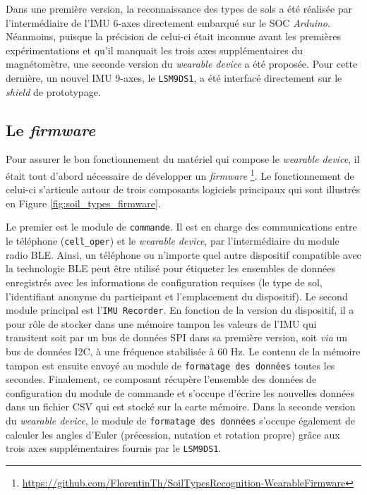 Dans une première version, la reconnaissance des types de sols a été réalisée par l'intermédiaire de l'IMU 6-axes directement embarqué sur le \acs{SOC} \textit{Arduino}. Néanmoins, puisque la précision de celui-ci était inconnue avant les premières expérimentations et qu'il manquait les trois axes supplémentaires du magnétomètre, une seconde version du \textit{wearable device} a été proposée. Pour cette dernière, un nouvel IMU 9-axes, le \texttt{LSM9DS1}, a été interfacé directement sur le \textit{shield} de prototypage.

\subsection{Le \textit{firmware}}

Pour assurer le bon fonctionnement du matériel qui compose le \textit{wearable device}, il était tout d'abord nécessaire de développer un \textit{firmware} \footnote{\url{https://github.com/FlorentinTh/SoilTypesRecognition-WearableFirmware}}. Le fonctionnement de celui-ci s'articule autour de trois composants logiciels principaux qui sont illustrés en Figure \ref{fig:soil_types_firmware}.

Le premier est le module de \texttt{commande}. Il est en charge des communications entre le téléphone (\texttt{cell\_oper}) et le \textit{wearable device}, par l'intermédiaire du module radio \acs{BLE}. Ainsi, un téléphone ou n'importe quel autre dispositif compatible avec la technologie \acs{BLE} peut être utilisé pour étiqueter les ensembles de données enregistrés avec les informations de configuration requises (le type de sol, l'identifiant anonyme du participant et l'emplacement du dispositif). Le second module principal est l'\texttt{\acs{IMU} Recorder}. En fonction de la version du dispositif, il a pour rôle de stocker dans une mémoire tampon les valeurs de l'\acs{IMU} qui transitent soit par un bus de données \ac{SPI} dans sa première version, soit \textit{via} un bus de données \ac{I2C}, à une fréquence stabilisée à 60 Hz. Le contenu de la mémoire tampon est ensuite envoyé au module de \texttt{formatage des données} toutes les secondes. Finalement, ce composant récupère l'ensemble des données de configuration du module de commande et s'occupe d'écrire les nouvelles données dans un fichier \ac{CSV} qui est stocké sur la carte mémoire. Dans la seconde version du \textit{wearable device}, le module de \texttt{formatage des données} s'occupe également de calculer les angles d'Euler (précession, nutation et rotation propre) grâce aux trois axes supplémentaires fournis par le \texttt{LSM9DS1}.

